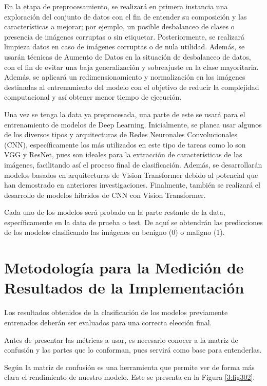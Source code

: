 En la etapa de preprocesamiento, se realizará en primera instancia una exploración del conjunto de datos con el fin de entender su composición y las características a mejorar; por ejemplo, un posible desbalanceo de clases o presencia de imágenes corruptas o sin etiquetar. Posteriormente, se realizará limpieza datos en caso de imágenes corruptas o de nula utilidad. Además, se usarán técnicas de Aumento de Datos en la situación de desbalanceo de datos, con el fin de evitar una baja generalización y sobreajuste en la clase mayoritaria. Además, se aplicará un redimensionamiento y normalización en las imágenes destinadas al entrenamiento del modelo con el objetivo de reducir la complejidad computacional y así obtener menor tiempo de ejecución.

Una vez se tenga la data ya preprocesada, una parte de este se usará para el entrenamiento de modelos de Deep Learning. Inicialmente, se planea usar algunos de los diversos tipos y arquitecturas de Redes Neuronales Convolucionales (CNN), específicamente los más utilizados en este tipo de tareas como lo son VGG y ResNet, pues son ideales para la extracción de características de las imágenes, facilitando así el proceso final de clasificación. Además, se desarrollarán modelos basados en arquitecturas de Vision Transformer debido al potencial que han demostrado en anteriores investigaciones. Finalmente, también se realizará el desarrollo de modelos híbridos de CNN con Vision Transformer. %

Cada uno de los modelos será probado en la parte restante de la data, específicamente en la data de prueba o test. De aquí se obtendrán las predicciones de los modelos clasificando las imágenes en benigno (0) o maligno (1).

\section{Metodología para la Medición de Resultados de la Implementación}

Los resultados obtenidos de la clasificación de los modelos previamente entrenados deberán ser evaluados para una correcta elección final. 

Antes de presentar las métricas a usar, es necesario conocer a la matriz de confusión y las partes que lo conforman, pues servirá como base para entenderlas. 

Según \cite{ws_izco2018bdcp} la matriz de confusión es una herramienta que permite ver de forma más clara el rendimiento de nuestro modelo. Este se presenta en la Figura \ref{3:fig302}.

